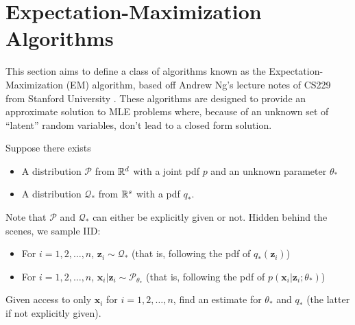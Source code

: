\section{Expectation-Maximization Algorithms}
This section aims to define a class of algorithms known as the Expectation-Maximization (EM) algorithm, based off Andrew Ng's lecture notes of CS229 from Stanford University \cite{em_notes}. These algorithms are designed to provide an approximate solution to MLE problems where, because of an unknown set of ``latent'' random variables, don't lead to a closed form solution.
\begin{definition}
    Suppose there exists 
    \begin{itemize}
        \item A distribution $\mathcal{P}$ from $\mathbb{R}^d$ with a joint pdf $p$ and an unknown parameter $\theta_*$
        \item A distribution $\mathcal{Q}_*$ from $\mathbb{R}^s$ with a pdf $q_*$.
    \end{itemize}
    Note that $\mathcal{P}$ and $\mathcal{Q}_*$ can either be explicitly given or not. Hidden behind the scenes, we sample IID:
    \begin{itemize}
        \item For $i=1,2,\dots,n$, $\mathbf{z}_i\sim\mathcal{Q}_*$ (that is, following the pdf of $q_*(\mathbf{z}_i)$)
        \item For $i=1,2,\dots,n$, $\mathbf{x}_i|\mathbf{z}_i\sim\mathcal{P}_{\theta_*}$ (that is, following the pdf of $p(\mathbf{x}_i|\mathbf{z}_i;\theta_*)$)
    \end{itemize}
    Given access to only $\mathbf{x}_i$ for $i=1,2,\dots,n$, find an estimate for $\theta_*$ and $q_*$ (the latter if not explicitly given).
\end{definition}
